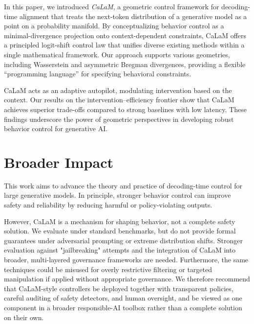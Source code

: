 \documentclass{article}
\theoremstyle{plain}
\theoremstyle{definition}
\theoremstyle{remark}
\begin{document}
In this paper, we introduced \emph{CaLaM}, a geometric control framework for decoding-time alignment that treats the next-token distribution of a generative model as a point on a probability manifold. By conceptualizing behavior control as a minimal-divergence projection onto context-dependent constraints, CaLaM offers a principled logit-shift control law that unifies diverse existing methods within a single mathematical framework. Our approach supports various geometries, including Wasserstein and asymmetric Bregman divergences, providing a flexible ``programming language'' for specifying behavioral constraints.

CaLaM acts as an adaptive autopilot, modulating intervention based on the context. Our results on the intervention--efficiency frontier show that CaLaM achieves superior trade-offs compared to strong baselines with low latency. These findings underscore the power of geometric perspectives in developing robust behavior control for generative AI.


% 
\section*{Broader Impact}
This work aims to advance the theory and practice of decoding-time control for large generative models. In principle, stronger behavior control can improve safety and reliability by reducing harmful or policy-violating outputs. 

However, CaLaM is a mechanism for shaping behavior, not a complete safety solution. We evaluate under standard benchmarks, but do not provide formal guarantees under adversarial prompting or extreme distribution shifts. Stronger evaluation against "jailbreaking" attempts and the integration of CaLaM into broader, multi-layered governance frameworks are needed. Furthermore, the same techniques could be misused for overly restrictive filtering or targeted manipulation if applied without appropriate governance. We therefore recommend that CaLaM-style controllers be deployed together with transparent policies, careful auditing of safety detectors, and human oversight, and be viewed as one component in a broader responsible-AI toolbox rather than a complete solution on their own.
\end{document}
